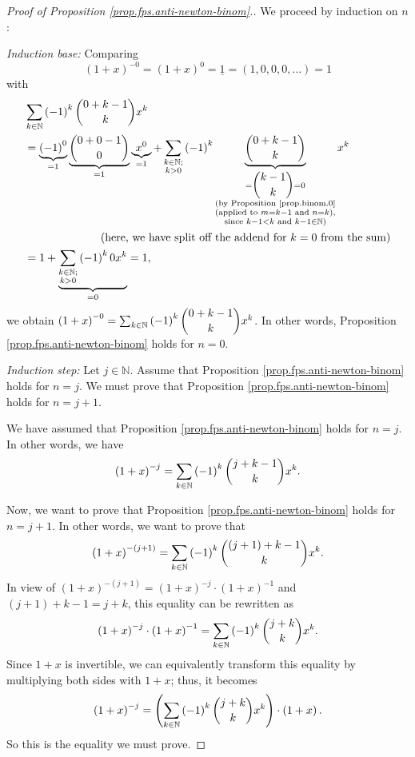 \begin{proof}
[Proof of Proposition \ref{prop.fps.anti-newton-binom}.]We proceed by
induction on $n$:

\textit{Induction base:} Comparing
\[
\left(  1+x\right)  ^{-0}=\left(  1+x\right)  ^{0}=\underline{1}=\left(
1,0,0,0,\ldots\right)  =1
\]
with%
\begin{align*}
&  \sum_{k\in\mathbb{N}}\left(  -1\right)  ^{k}\dbinom{0+k-1}{k}x^{k}\\
&  =\underbrace{\left(  -1\right)  ^{0}}_{=1}\underbrace{\dbinom{0+0-1}{0}%
}_{=1}\underbrace{x^{0}}_{=1}+\sum_{\substack{k\in\mathbb{N};\\k>0}}\left(
-1\right)  ^{k}\underbrace{\dbinom{0+k-1}{k}}_{\substack{=\dbinom{k-1}%
{k}=0\\\text{(by Proposition \ref{prop.binom.0}}\\\text{(applied to
}m=k-1\text{ and }n=k\text{),}\\\text{since }k-1<k\text{ and }k-1\in
\mathbb{N}\text{)}}}x^{k}\\
&  \ \ \ \ \ \ \ \ \ \ \ \ \ \ \ \ \ \ \ \ \left(  \text{here, we have split
off the addend for }k=0\text{ from the sum}\right) \\
&  =1+\underbrace{\sum_{\substack{k\in\mathbb{N};\\k>0}}\left(  -1\right)
^{k}0x^{k}}_{=0}=1,
\end{align*}
we obtain $\left(  1+x\right)  ^{-0}=\sum_{k\in\mathbb{N}}\left(  -1\right)
^{k}\dbinom{0+k-1}{k}x^{k}$. In other words, Proposition
\ref{prop.fps.anti-newton-binom} holds for $n=0$.

\textit{Induction step:} Let $j\in\mathbb{N}$. Assume that Proposition
\ref{prop.fps.anti-newton-binom} holds for $n=j$. We must prove that
Proposition \ref{prop.fps.anti-newton-binom} holds for $n=j+1$.

We have assumed that Proposition \ref{prop.fps.anti-newton-binom} holds for
$n=j$. In other words, we have%
\begin{equation}
\left(  1+x\right)  ^{-j}=\sum_{k\in\mathbb{N}}\left(  -1\right)  ^{k}%
\dbinom{j+k-1}{k}x^{k}. \label{pf.prop.fps.anti-newton-binom.IH}%
\end{equation}


Now, we want to prove that Proposition \ref{prop.fps.anti-newton-binom} holds
for $n=j+1$. In other words, we want to prove that%
\[
\left(  1+x\right)  ^{-\left(  j+1\right)  }=\sum_{k\in\mathbb{N}}\left(
-1\right)  ^{k}\dbinom{\left(  j+1\right)  +k-1}{k}x^{k}.
\]
In view of $\left(  1+x\right)  ^{-\left(  j+1\right)  }=\left(  1+x\right)
^{-j}\cdot\left(  1+x\right)  ^{-1}$ and $\left(  j+1\right)  +k-1=j+k$, this
equality can be rewritten as%
\[
\left(  1+x\right)  ^{-j}\cdot\left(  1+x\right)  ^{-1}=\sum_{k\in\mathbb{N}%
}\left(  -1\right)  ^{k}\dbinom{j+k}{k}x^{k}.
\]
Since $1+x$ is invertible, we can equivalently transform this equality by
multiplying both sides with $1+x$; thus, it becomes%
\[
\left(  1+x\right)  ^{-j}=\left(  \sum_{k\in\mathbb{N}}\left(  -1\right)
^{k}\dbinom{j+k}{k}x^{k}\right)  \cdot\left(  1+x\right)  .
\]
So this is the equality we must prove.


\end{proof}

